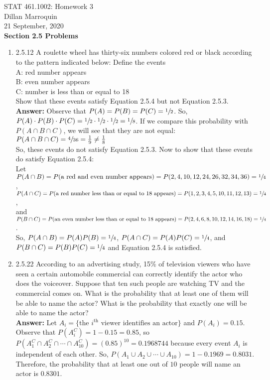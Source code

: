 \documentclass{article}
\begin{document}
    \noindent STAT 461.1002: Homework 3\\
    Dillan Marroquin\\
    21 September, 2020\\

    \quad \textbf{Section 2.5 Problems}
    \begin{enumerate}
        \item 2.5.12 A roulette wheel has thirty-six numbers colored red or black according to the pattern indicated below:
        Define the events\\
        \quad A: red number appears\\
        \quad B: even number appears\\
        \quad C: number is less than or equal to 18\\
        Show that these events satisfy Equation 2.5.4 but not Equation 2.5.3.\\
        \textbf{Answer: } Observe that $P(A) = P(B) = P(C) = \sfrac{1}{2}$. So, $P(A) \cdot P(B) \cdot P(C) = \sfrac{1}{2} \cdot \sfrac{1}{2} \cdot \sfrac{1}{2} = \sfrac{1}{8}$. If we compare this probability with $P(A \cap B \cap C)$, we will see that they are not equal: $P(A \cap B \cap C) = \sfrac{4}{36} = \frac{1}{9} \neq \frac{1}{8}$\\
        So, these events do not satisfy Equation 2.5.3. Now to show that these events do satisfy Equation 2.5.4:\\
        
        Let\\
        $P(A \cap B) = P(\text{a red and even number appears}) = P(2,4,10,12,24,26,32,34,36) = \sfrac{1}{4}$,
        \\ $P(A \cap C) = P(\text{a red number less than or equal to 18 appears}) = P(1,2,3,4,5,10,11,12,13) = \sfrac{1}{4}$,
        \\ and $P(B \cap C) = P(\text{an even number less than or equal to 18 appears}) = P(2,4,6,8,10,12,14,16,18) = \sfrac{1}{4}$.\\
        So, $P(A \cap B) = P(A)P(B) = \sfrac{1}{4}$, $P(A \cap C) = P(A)P(C) = \sfrac{1}{4}$, and $P(B \cap C) = P(B)P(C) = \sfrac{1}{4}$ and Equation 2.5.4 is satisfied.
        

        \item 2.5.22 According to an advertising study, 15\% of television viewers who have seen a certain automobile commercial can correctly identify the actor who does the voiceover. Suppose that ten such people are watching TV and the commercial comes on. What is the probability that at least one of them will be able to name the actor? What is the probability that exactly one will be able to name the actor?\\
        \textbf{Answer: }Let $A_i = \{\text{the }i^{\text{th}} \text{ viewer identifies an actor}\}$ and $P(A_i) = 0.15$. Observe that $P(A_i^C) = 1-0.15 = 0.85$, so $P(A_1^C \cap A_2^C \cap \cdots \cap A_{10}^C) = (0.85)^{10} = 0.1968744$ because every event $A_i$ is independent of each other. So, $P(A_1 \cup A_2 \cup \cdots \cup A_{10}) = 1-0.1969 = 0.8031$. Therefore, the probability that at least one out of $10$ people will name an actor is $0.8301$.\\
            


\end{enumerate}
\end{document}
